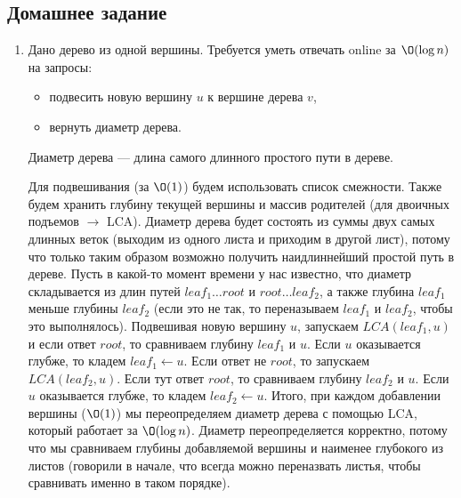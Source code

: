 

\subsection{Домашнее задание}
\begin{enumerate}
	
  \item
	Дано дерево из одной вершины. Требуется уметь отвечать online за $\O(\log n)$ на запросы:
	\begin{itemize}
	  \item подвесить новую вершину $u$ к вершине дерева $v$,
	  \item вернуть диаметр дерева.
	\end{itemize}
	Диаметр дерева --- длина самого длинного простого пути в дереве.
	\begin{solution}
		Для подвешивания (за $\O(1)$) будем использовать список смежности. Также будем хранить глубину текущей вершины и массив родителей (для двоичных подъемов $\rightarrow$ LCA). Диаметр дерева будет состоять из суммы двух самых длинных веток (выходим из одного листа и приходим в другой лист), потому что только таким образом возможно получить наидлиннейший простой путь в дереве. Пусть в какой-то момент времени у нас известно, что диаметр складывается из длин путей $leaf_1\ldots root$ и $root\ldots leaf_2$, а также глубина $leaf_1$ меньше глубины $leaf_2$ (если это не так, то переназываем $leaf_1$ и $leaf_2$, чтобы это выполнялось). Подвешивая новую вершину $u$, запускаем $LCA(leaf_1, u)$ и если ответ $root$, то сравниваем глубину $leaf_1$ и $u$. Если $u$ оказывается глубже, то кладем $leaf_1 \leftarrow u$. Если ответ не $root$, то запускаем $LCA(leaf_2, u)$. Если тут ответ $root$, то сравниваем глубину $leaf_2$ и $u$. Если $u$ оказывается глубже, то кладем $leaf_2 \leftarrow u$. Итого, при каждом добавлении вершины ($\O(1)$) мы переопределяем диаметр дерева с помощью LCA, который работает за $\O(\log n)$. Диаметр переопределяется корректно, потому что мы сравниваем глубины добавляемой вершины и наименее глубокого из листов (говорили в начале, что всегда можно переназвать листья, чтобы сравнивать именно в таком порядке).
	\end{solution}
	

\end{enumerate}

